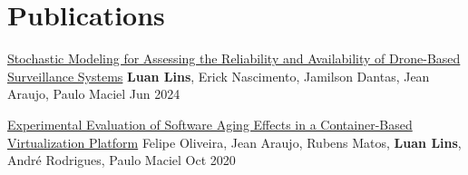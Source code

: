\section{Publications}
    \resumeSubHeadingListStart

    \resumePubliSubheading
    {\href{https://doi.org/10.1109/SysCon61195.2024.10553470}{Stochastic Modeling for Assessing the Reliability and Availability of Drone-Based Surveillance Systems}}
    {\textbf{Luan Lins}, Erick Nascimento, Jamilson Dantas, Jean Araujo, Paulo Maciel}
    {Jun 2024}
    

    \resumePubliSubheading
    {\href{https://doi.org/10.1109/SMC42975.2020.9283358}{Experimental Evaluation of Software Aging Effects in a Container-Based Virtualization Platform}}
    {Felipe Oliveira, Jean Araujo, Rubens Matos, \textbf{Luan Lins}, André Rodrigues, Paulo Maciel}
    {Oct 2020}
    

    \resumeSubHeadingListEnd